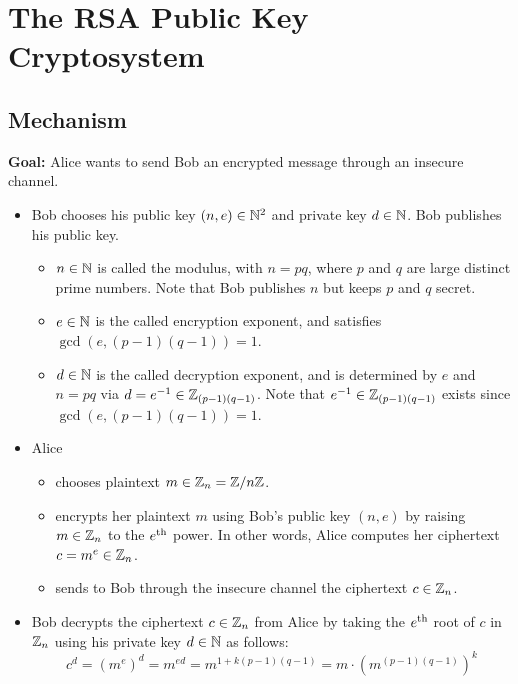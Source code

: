 
\section{The RSA Public Key Cryptosystem}
\setcounter{theorem}{0}
\setcounter{equation}{0}

\subsection{Mechanism}

\textbf{Goal:} Alice wants to send Bob an encrypted message through an insecure channel.
\begin{itemize}
\item	Bob chooses his public key $(n,e) \in \mathbb{N}^{2}$ and private key $d \in \mathbb{N}$.
	Bob publishes his public key.
	\begin{itemize}
	\item	$n \in \mathbb{N}$ is called the modulus, with $n = pq$, where $p$ and $q$ are large distinct
		prime numbers.  Note that Bob publishes $n$ but keeps $p$ and $q$ secret.
	\item	$e \in \mathbb{N}$ is the called encryption exponent, and satisfies $\gcd(e,(p-1)(q-1)) = 1$.
	\item	$d \in \mathbb{N}$ is the called decryption exponent, and is determined by $e$ and $n = pq$
		via $d = e^{-1} \in \mathbb{Z}_{(p-1)(q-1)}$.
		Note that $e^{-1} \in \mathbb{Z}_{(p-1)(q-1)}$ exists since $\gcd(e,(p-1)(q-1)) = 1$.
	\end{itemize}
\item	Alice
	\begin{itemize}
	\item	chooses plaintext $m \in \mathbb{Z}_{n} = \mathbb{Z}/n\mathbb{Z}$.
	\item	encrypts her plaintext $m$ using Bob's public key $(n,e)$
		by {\color{red}raising $m \in \mathbb{Z}_{n}$ to the $e^{\textnormal{th}}$ power}.
		In other words, Alice computes her ciphertext $c = m^{e} \in \mathbb{Z}_{n}$.
	\item	sends to Bob through the insecure channel the ciphertext $c \in \mathbb{Z}_{n}$.
	\end{itemize}
\item	Bob decrypts the ciphertext $c \in \mathbb{Z}_{n}$ from Alice by
	{\color{red}taking the $e^{\textnormal{th}}$ root}
	of $c$ in $\mathbb{Z}_{n}$ using his private key $d \in \mathbb{N}$ as follows:
	\begin{equation*}
	c^{d} = \left(m^{e}\right)^{d} = m^{ed} = m^{1+k(p-1)(q-1)} = m \cdot (m^{(p-1)(q-1)})^{k}

\end{equation*}
\end{itemize}
